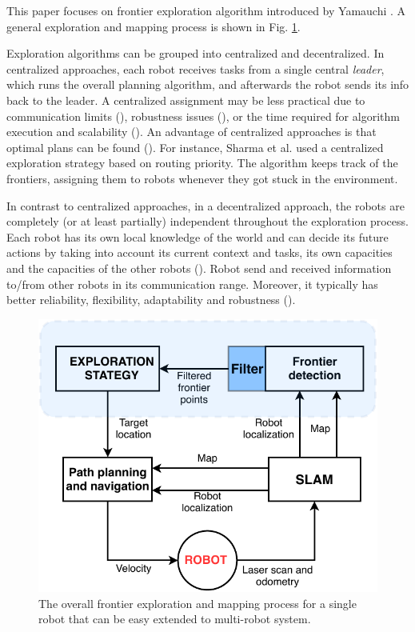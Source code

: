This paper focuses on frontier exploration algorithm introduced by Yamauchi \cite{Yamauchi1997}. A general exploration and mapping process is shown in Fig. \ref{fig:strategy_one_robot}. 

Exploration algorithms can be grouped into centralized and decentralized. In centralized approaches, each robot receives tasks from a single central \emph{leader}, which runs the overall planning algorithm, and afterwards the robot sends its info back to the leader. A centralized assignment may be less practical due to communication limits (\cite{Dias2000}), robustness issues (\cite{Dias2006}), or the time required for algorithm execution and scalability (\cite{Julia2012}). An advantage of centralized approaches is that optimal plans can be found (\cite{Yan2011}). For instance, Sharma et al. \cite{SharmaHonc2016} used a centralized exploration strategy based on routing priority. The algorithm keeps track of the frontiers, assigning them to robots whenever they got stuck in the environment.

In contrast to centralized approaches, in a decentralized approach, the robots are completely (or at least partially) independent throughout the exploration process. Each robot has its own local knowledge of the world and can decide its future actions by taking into account its current context and tasks, its own capacities and the capacities of the other robots (\cite{Yan2013}). Robot send and received information to/from other robots in its communication range. Moreover, it typically has better reliability, flexibility, adaptability and robustness (\cite{Zlot2002}). 

\begin{figure}[t!]
	\centering
	\includegraphics[width=1.0\columnwidth]{./pictures/strategy_one_robot.pdf}
	\caption {The overall frontier exploration and mapping process for a single robot that can be easy extended to multi-robot system.}
	\label{fig:strategy_one_robot}
\end{figure}
 
